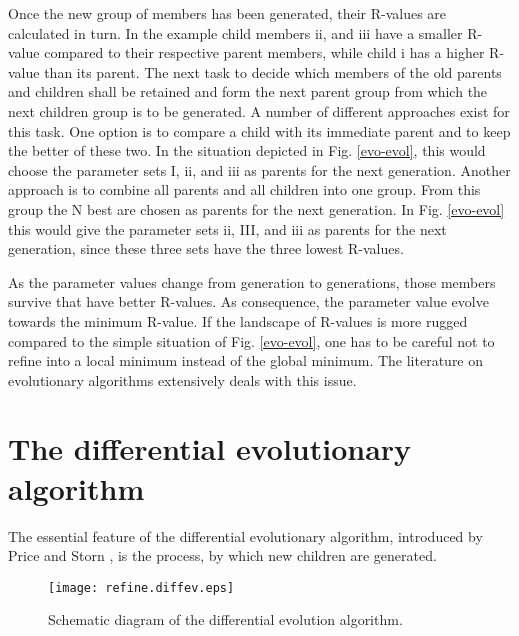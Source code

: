 Once the new group of members has been generated, their R-values are 
calculated in turn. In the example child members ii, and iii have a
smaller R-value compared to their respective parent members, while
child i has a higher R-value than its parent. The next task to decide 
which members of the old parents and children shall be retained and 
form the next parent group from which the next children group is to be
generated. A number of different approaches exist for this task. One
option is to compare a child with its immediate parent and to keep the 
better of these two. In the situation depicted in Fig. \ref{evo-evol},
this would choose the parameter sets I, ii, and iii as parents for the
next generation. Another approach is to combine all parents and all
children into one group. From this group the N best are chosen as 
parents for the next generation. In Fig. \ref{evo-evol} this would
give the parameter sets ii, III, and iii as parents for the next 
generation, since these three sets have the three lowest R-values.

As the parameter values change from generation to generations, those
members survive that have better R-values. As consequence, the parameter
value evolve towards the minimum R-value. If the landscape of R-values
is more rugged compared to the simple situation of 
Fig. \ref{evo-evol}, one has to be careful not to refine into a
local minimum instead of the global minimum. The literature on 
evolutionary algorithms extensively deals with this issue.

\section{The differential evolutionary algorithm \label{diff-price}}

The essential feature of the differential evolutionary algorithm, 
introduced by Price and Storn \cite{prstla2005}, is the process, by which
new children are generated.

\begin{figure}[htbp]
   \texttt{[image: refine.diffev.eps]}
   \caption{Schematic diagram of the differential evolution algorithm.}
   \label{evo-select}
\end{figure}

